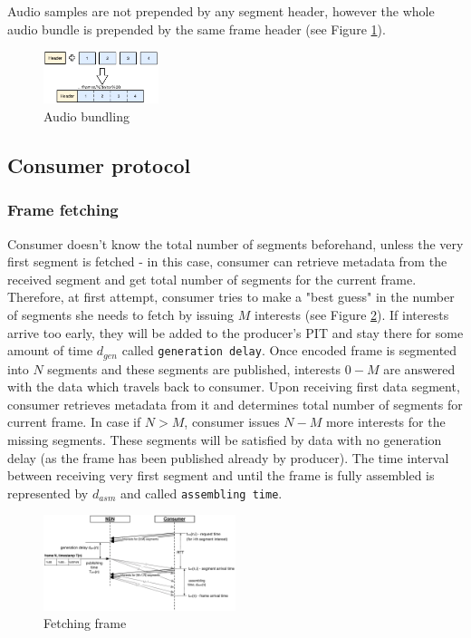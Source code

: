 \documentclass[10pt]{proc}
\begin{document}
Audio samples are not prepended by any segment header, however the whole audio bundle is prepended by the same frame header (see Figure \ref{fig:audio-bundling}).

\begin{figure}[Ht!]
\centering
\includegraphics[width=0.3\textwidth]{audio-bundling}
\caption{Audio bundling}
\label{fig:audio-bundling}
\end{figure}


\subsection{Consumer protocol}

\subsubsection{Frame fetching}

Consumer doesn't know the total number of segments beforehand, unless the very first segment is fetched - in this case, consumer can retrieve metadata from the received segment and get total number of segments for the current frame. 
Therefore, at first attempt, consumer tries to make a "best guess" in the number of segments she needs to fetch by issuing $M$ interests (see Figure \ref{fig:pull}). If interests arrive too early, they will be added to the producer's PIT and stay there for some amount of time $d_{gen}$ called \texttt{generation delay}. Once encoded frame is segmented into $N$ segments and these segments are published, interests $0 - M$ are answered with the data which travels back to consumer. Upon receiving first data segment, consumer retrieves metadata from it and determines total number of segments for current frame. In case if $N > M$, consumer issues $N - M$ more interests for the missing segments. These segments will be satisfied by data with no generation delay (as the frame has been published already by producer). The time interval between receiving very first segment and until the frame is fully assembled is represented by $d_{asm}$ and called \texttt{assembling time}.

\begin{figure}[Ht!]
\centering
\includegraphics[width=0.5\textwidth]{frame-fetch}
\caption{Fetching frame}
\label{fig:pull}
\end{figure}
\end{document}
